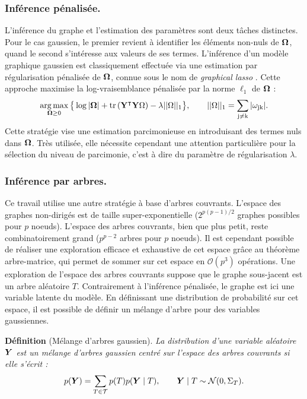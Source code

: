   \subsubsection*{Inférence pénalisée.}
  L'inférence du graphe et l'estimation des paramètres sont deux tâches distinctes. Pour le cas gaussien, le premier revient à identifier les éléments non-nuls de ${\boldsymbol{\Omega}}$, quand le second s'intéresse aux valeurs de ses termes. L'inférence d'un modèle graphique gaussien est classiquement effectuée via une estimation par régularisation pénalisée de ${\boldsymbol{\Omega}}$, connue sous le nom de \textit{graphical lasso} \citep{FHT08}. Cette approche maximise la log-vraisemblance pénalisée par la norme $\ell_1$ de ${\boldsymbol{\Omega}}$ :
 $$\operatorname*{arg\,max}_{{\boldsymbol{\Omega}}\geq 0} \big\{\log |{\boldsymbol{\Omega}}| +\rm tr\left( {\bf Y}^\intercal {\bf Y} {\boldsymbol{\Omega}} \right) - \lambda ||{\boldsymbol{\Omega}}||_1\big\}, \qquad ||{\boldsymbol{\Omega}}||_1 = \sum_{j\neq k} |\omega_{jk}|.$$
  Cette stratégie vise une estimation parcimonieuse en introduisant des termes nuls dans ${\boldsymbol{\Omega}}$. Très utilisée, elle nécessite cependant une attention particulière pour la sélection du niveau de parcimonie, c'est à dire du paramètre de régularisation $\lambda$.\\
  
    \subsubsection*{Inférence par arbres.}
  Ce travail utilise une autre stratégie à base d'arbres couvrants. L'espace des graphes non-dirigés est de taille super-exponentielle ($2^{p(p-1)/2}$ graphes possibles pour $p$ noeuds). L'espace des arbres couvrants, bien que plus petit, reste combinatoirement grand ($p^{p-2}$ arbres pour $p$ noeuds). Il est cependant possible de réaliser une exploration efficace et exhaustive de cet espace grâce au théorème arbre-matrice, qui permet de sommer sur cet espace en $\mathcal{O}(p^3)$ opérations. Une exploration de l'espace des arbres couvrants suppose que le graphe sous-jacent est un arbre aléatoire $T$. Contrairement à l'inférence pénalisée, le graphe est ici une variable latente du modèle. En définissant une distribution de probabilité sur cet espace, il est possible de définir un mélange d'arbre \citep{MixtTrees} pour des variables gaussiennes.
   
\textbf{Définition} (Mélange d'arbres gaussien). \textit{La distribution d'une variable aléatoire ${\boldsymbol{Y}}$ est un mélange d'arbres gaussien centré sur l'espace des arbres couvrants si elle s'écrit :
$$p({\boldsymbol{Y}}) = \sum_{T\in \mathcal{T}} p(T) p({\boldsymbol{Y}} \mid T), \qquad {\boldsymbol{Y}}\mid T \sim \mathcal{N}(0, \Sigma_T).$$}

